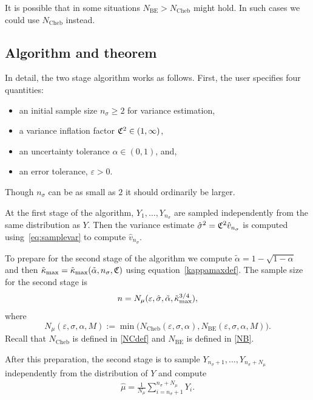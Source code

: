 \documentclass{article}
\begin{document}
It is possible that in some situations
$N_{\mathrm{BE}}>N_{\mathrm{Cheb}}$ might
hold. In such cases we could use $N_{\mathrm{Cheb}}$
instead.

\subsection{Algorithm and theorem}

In detail, the two stage algorithm works
as follows.  First, the user specifies
four quantities:
\begin{itemize}
\item 
an initial sample size $n_\sigma\ge 2$
for variance estimation,
\item
a variance inflation factor $\mathfrak{C}^2\in(1,\infty)$,
\item
an uncertainty tolerance $\alpha\in(0,1)$, and,
\item
an error tolerance, $\varepsilon>0$.
\end{itemize}
Though $n_\sigma$ can be as small as $2$ it should
ordinarily be larger.  


At the first stage of the algorithm,
$Y_1,\dots,Y_{n_\sigma}$ are sampled independently
from the same distribution as $Y$.
Then the variance estimate $\hat\sigma^2 = \mathfrak{C}^2\hat v_{n_\sigma}$
is computed using~\eqref{eq:samplevar} to compute
$\hat v_{n_\sigma}$.

To prepare for the second stage of the algorithm
we compute $\tilde\alpha = 1-\sqrt{1-\alpha}$
and then $\tilde\kappa_{\max} = \tilde\kappa_{\max}(\tilde\alpha,n_\sigma,\mathfrak{C})$
using equation~\eqref{kappamaxdef}.
The sample size for the second stage is
\[
n = N_{\mu}(\varepsilon,\hat\sigma,\tilde\alpha,\tilde\kappa_{\max}^{3/4}),
\]
where
\begin{equation} \label{NCBdef}
N_{\mu}(\varepsilon,\sigma,\alpha,M) 
:= \min\bigl( N_{\mathrm{Cheb}}(\varepsilon,\sigma,\alpha), 
N_{\mathrm{BE}}(\varepsilon,\sigma,\alpha,M) \bigr).
\end{equation} 
Recall that
$N_{\mathrm{Cheb}}$ is defined in \eqref{NCdef} and  $N_{\mathrm{BE}}$ 
is defined in \eqref{NB}.  

After this preparation, the second stage is to sample
$Y_{n_\sigma+1},\dots,Y_{n_\sigma+N_\mu}$ independently
from the distribution of $Y$ and compute
\begin{align}\label{eq:theestimate}
\hat\mu = \frac1{N_\mu}\sum_{i=n_\sigma+1}^{n_\sigma+N_\mu}Y_i.
\end{align}
\end{document}

